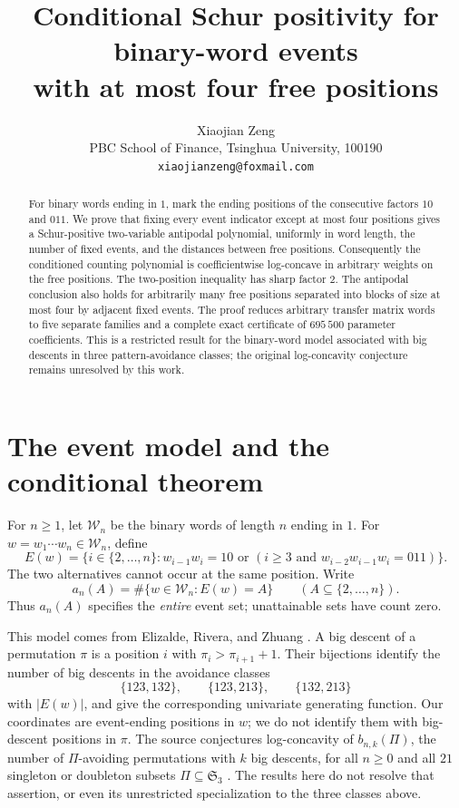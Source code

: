\documentclass[11pt]{article}
\title{Conditional Schur positivity for binary-word events\\with at most four free positions}
\author{Xiaojian Zeng\\
\small PBC School of Finance, Tsinghua University, 100190\\
\small \texttt{xiaojianzeng@foxmail.com}}
\date{}
\begin{document}
\maketitle

\begin{abstract}
For binary words ending in $1$, mark the ending positions of the consecutive
factors $10$ and $011$. We prove that fixing every event indicator except at
most four positions gives a Schur-positive two-variable antipodal polynomial,
uniformly in word length, the number of fixed events, and the distances between
free positions. Consequently the conditioned counting polynomial is
coefficientwise log-concave in arbitrary weights on the free positions.
The two-position inequality has sharp factor $2$. The antipodal conclusion
also holds for arbitrarily many free positions separated into blocks of size
at most four by adjacent fixed events. The proof reduces arbitrary transfer
matrix words to five separate families and a complete exact certificate of
$695\,500$ parameter coefficients. This is a restricted result for the
binary-word model associated with big descents in three pattern-avoidance
classes; the original log-concavity conjecture remains unresolved by this work.
\end{abstract}

\section{The event model and the conditional theorem}

For $n\ge1$, let $\mathcal W_n$ be the binary words of length $n$ ending in $1$.
For $w=w_1\cdots w_n\in\mathcal W_n$, define
\[
 E(w)=\{i\in\{2,\ldots,n\}:w_{i-1}w_i=10
       \text{ or }(i\ge3\text{ and }w_{i-2}w_{i-1}w_i=011)\}.
\]
The two alternatives cannot occur at the same position. Write
\[
 a_n(A)=\#\{w\in\mathcal W_n:E(w)=A\}
 \qquad(A\subseteq\{2,\ldots,n\}).
\]
Thus $a_n(A)$ specifies the \emph{entire} event set; unattainable sets have
count zero.

This model comes from Elizalde, Rivera, and Zhuang
\cite[Theorems~3.5 and~3.8; Lemmas~3.6 and~3.9]{ERZ}.
A big descent of a permutation $\pi$ is a position $i$ with
$\pi_i>\pi_{i+1}+1$. Their bijections identify the number of big descents in
the avoidance classes
\[
 \{123,132\},\qquad \{123,213\},\qquad \{132,213\}
\]
with $|E(w)|$, and give the corresponding univariate generating function.
Our coordinates are event-ending positions in $w$; we do not identify them
with big-descent positions in $\pi$.
The source conjectures log-concavity of $b_{n,k}(\Pi)$, the number of
$\Pi$-avoiding permutations with $k$ big descents, for all $n\ge0$ and
all $21$ singleton or doubleton subsets $\Pi\subseteq\mathfrak S_3$
\cite[Conjecture~4.6]{ERZ}. The results here do not resolve that assertion,
or even its unrestricted specialization to the three classes above.
\end{document}

